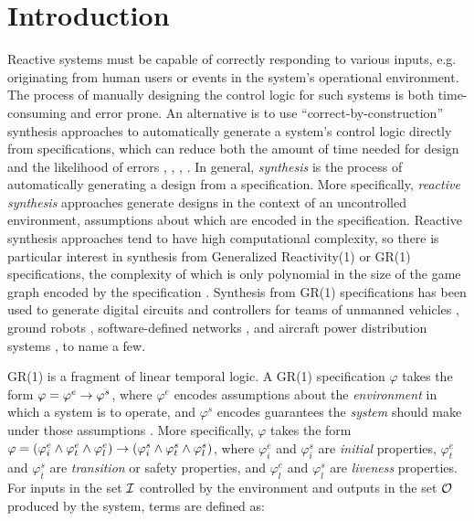 \documentclass[runningheads]{llncs}
\begin{document}
\section{Introduction}

Reactive systems must be capable of correctly responding to various inputs, 
e.g. originating from human users or events in the system's operational environment. 
The process of manually designing the control logic for such systems is both time-consuming and error prone. 
An alternative is to use ``correct-by-construction'' synthesis approaches to automatically generate 
a system's control logic directly from specifications, which can 
reduce both the amount of time needed for design and the likelihood of errors 
\cite{alur2016compositional}, \cite{fainekos2009temporal}, \cite{guo2014cooperative}, \cite{kupermann2001synthesizing}. 
In general, \emph{synthesis} is the process of automatically generating a design from a specification. 
More specifically, \emph{reactive synthesis} approaches generate designs in the context of an uncontrolled environment, 
assumptions about which are encoded in the specification.
Reactive synthesis approaches tend to have high computational complexity,  
so there is particular interest in synthesis from Generalized Reactivity(1) or GR(1) specifications, 
the complexity of which is only polynomial in the size of the game graph encoded by the specification \cite{bloem2012}. 
Synthesis from GR(1) specifications has been used to generate digital circuits \cite{ehlers2012symbolically} 
and controllers for teams of unmanned vehicles \cite{apker2016}, ground robots \cite{kress2007s}, 
software-defined networks \cite{wang2013automated}, and aircraft power distribution systems \cite{xu2012case}, to name a few.

GR(1) is a fragment of linear temporal logic. 
A GR(1) specification $\varphi$ takes the form $\varphi = \varphi^e \rightarrow \varphi^s$, 
where $\varphi^e$ encodes assumptions about the \emph{environment} in which a system is to operate,
and $\varphi^s$ encodes guarantees the \emph{system} should make under those assumptions \cite{Ehlers2016}. 
More specifically, $\varphi$ takes the form 
$\varphi = (\varphi^e_i \land \varphi^e_t \land \varphi^e_l)  \rightarrow (\varphi^s_i \land \varphi^s_t \land \varphi^s_l)$,
where $\varphi^e_i$ and $\varphi^s_i$ are \emph{initial} properties, 
$\varphi^e_t$ and $\varphi^s_t$ are \emph{transition} or safety properties, and 
$\varphi^e_l$ and $\varphi^s_l$ are \emph{liveness} properties. 
For inputs in the set $\mathcal{I}$ controlled by the environment 
and outputs in the set $\mathcal{O}$ produced by the system, terms are defined as:
\end{document}
